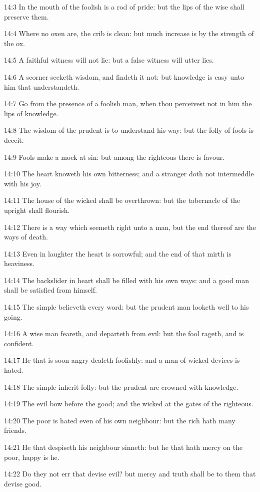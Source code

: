 14:3 In the mouth of the foolish is a rod of pride: but the lips of
the wise shall preserve them.

14:4 Where no oxen are, the crib is clean: but much increase is by the
strength of the ox.

14:5 A faithful witness will not lie: but a false witness will utter
lies.

14:6 A scorner seeketh wisdom, and findeth it not: but knowledge is
easy unto him that understandeth.

14:7 Go from the presence of a foolish man, when thou perceivest not
in him the lips of knowledge.

14:8 The wisdom of the prudent is to understand his way: but the folly
of fools is deceit.

14:9 Fools make a mock at sin: but among the righteous there is
favour.

14:10 The heart knoweth his own bitterness; and a stranger doth not
intermeddle with his joy.

14:11 The house of the wicked shall be overthrown: but the tabernacle
of the upright shall flourish.

14:12 There is a way which seemeth right unto a man, but the end
thereof are the ways of death.

14:13 Even in laughter the heart is sorrowful; and the end of that
mirth is heaviness.

14:14 The backslider in heart shall be filled with his own ways: and a
good man shall be satisfied from himself.

14:15 The simple believeth every word: but the prudent man looketh
well to his going.

14:16 A wise man feareth, and departeth from evil: but the fool
rageth, and is confident.

14:17 He that is soon angry dealeth foolishly: and a man of wicked
devices is hated.

14:18 The simple inherit folly: but the prudent are crowned with
knowledge.

14:19 The evil bow before the good; and the wicked at the gates of the
righteous.

14:20 The poor is hated even of his own neighbour: but the rich hath
many friends.

14:21 He that despiseth his neighbour sinneth: but he that hath mercy
on the poor, happy is he.

14:22 Do they not err that devise evil? but mercy and truth shall be
to them that devise good.

